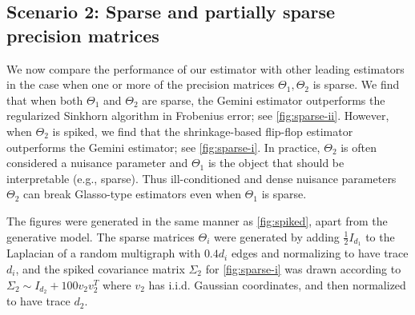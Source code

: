 \documentclass[aos]{imsart}
\theoremstyle{definition}
\numberwithin{equation}{section}
\begin{document}
\subsection{Scenario 2: Sparse and partially sparse precision matrices}
We now compare the performance of our estimator with other leading estimators in the case when one or more of the precision matrices $\Theta_1, \Theta_2$ is sparse. We find that when both $\Theta_1$ and $\Theta_2$ are sparse, the Gemini estimator outperforms the regularized Sinkhorn algorithm in Frobenius error; see \cref{fig:sparse-ii}. However, when $\Theta_2$ is spiked, we find that the shrinkage-based flip-flop estimator outperforms the Gemini estimator; see \cref{fig:sparse-i}. In practice, $\Theta_2$ is often considered a nuisance parameter and $\Theta_1$ is the object that should be interpretable (e.g., sparse). Thus ill-conditioned and dense nuisance parameters $\Theta_2$ can break Glasso-type estimators even when $\Theta_1$ is sparse.

The figures were generated in the same manner as \cref{fig:spiked}, apart from the generative model. The sparse matrices $\Theta_i$ were generated by adding $\frac{1}{2}I_{d_1}$ to the Laplacian of a random multigraph with $0.4 d_i$ edges and normalizing to have trace $d_i$, and the spiked covariance matrix $\Sigma_2$ for \cref{fig:sparse-i} was drawn according to $\Sigma_2 \sim I_{d_2} + 100 v_2v_2^T$ where $v_2$ has i.i.d. Gaussian coordinates, and then normalized to have trace $d_2$.
\end{document}
